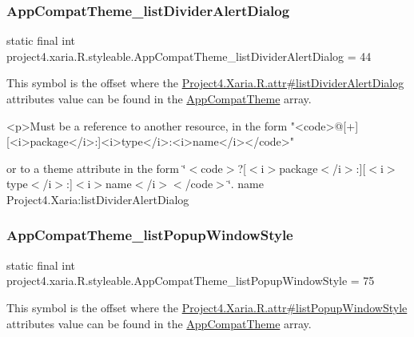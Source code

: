 \subsubsection{\texorpdfstring{App\+Compat\+Theme\+\_\+list\+Divider\+Alert\+Dialog}{AppCompatTheme\_listDividerAlertDialog}}
{\footnotesize\ttfamily static final int project4.\+xaria.\+R.\+styleable.\+App\+Compat\+Theme\+\_\+list\+Divider\+Alert\+Dialog = 44\hspace{0.3cm}{\ttfamily [static]}}

This symbol is the offset where the \hyperlink{}{Project4.\+Xaria.\+R.\+attr\#list\+Divider\+Alert\+Dialog} attribute\textquotesingle{}s value can be found in the \hyperlink{classproject4_1_1xaria_1_1R_1_1styleable_aad8bec413e2350f9404e6ff0e831a85d}{App\+Compat\+Theme} array.

\begin{DoxyVerb}      <p>Must be a reference to another resource, in the form "<code>@[+][<i>package</i>:]<i>type</i>:<i>name</i></code>"
\end{DoxyVerb}
 or to a theme attribute in the form \char`\"{}$<$code$>$?\mbox{[}$<$i$>$package$<$/i$>$\+:\mbox{]}\mbox{[}$<$i$>$type$<$/i$>$\+:\mbox{]}$<$i$>$name$<$/i$>$$<$/code$>$\char`\"{}.  name Project4.\+Xaria\+:list\+Divider\+Alert\+Dialog \mbox{\label{classproject4_1_1xaria_1_1R_1_1styleable_a7a98332996662c01b4f98ddc8776aa86}} 
\subsubsection{\texorpdfstring{App\+Compat\+Theme\+\_\+list\+Popup\+Window\+Style}{AppCompatTheme\_listPopupWindowStyle}}
{\footnotesize\ttfamily static final int project4.\+xaria.\+R.\+styleable.\+App\+Compat\+Theme\+\_\+list\+Popup\+Window\+Style = 75\hspace{0.3cm}{\ttfamily [static]}}

This symbol is the offset where the \hyperlink{}{Project4.\+Xaria.\+R.\+attr\#list\+Popup\+Window\+Style} attribute\textquotesingle{}s value can be found in the \hyperlink{classproject4_1_1xaria_1_1R_1_1styleable_aad8bec413e2350f9404e6ff0e831a85d}{App\+Compat\+Theme} array.

